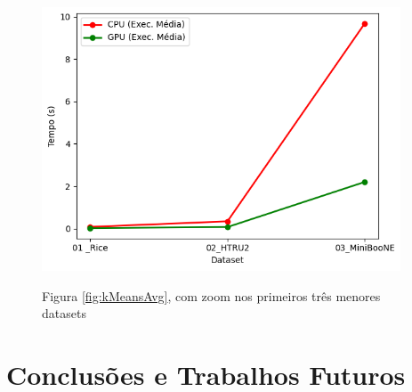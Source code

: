 \documentclass[12pt, %
openright, 
oneside, %
a4paper,    %
brazil]{facom-ufu-abntex2}
\begin{document}
\begin{figure}[h]
  \caption{Figura \ref{fig:kMeansAvg}, com zoom nos primeiros três menores datasets}
  \centering
  \includegraphics[width=0.95\textwidth]{kMeansResultsAvgZoomed.png}
  \label{fig:kMeansAvgZoomed}
\end{figure}





\chapter{Conclusões e Trabalhos Futuros}






\end{document}
